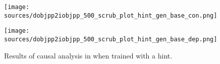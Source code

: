 \begin{figure}[t]
    \centering
    \begin{minipage}[b]{0.49\linewidth}
    \centering
    \texttt{[image: sources/dobjpp2iobjpp\_500\_scrub\_plot\_hint\_gen\_base\_con.png]}
    \end{minipage}
    \begin{minipage}[b]{0.49\linewidth}
    \centering
    \texttt{[image: sources/dobjpp2iobjpp\_500\_scrub\_plot\_hint\_gen\_base\_dep.png]}
    \end{minipage}
    \caption{Results of causal analysis in \dobjppiobjpp{} when trained with a hint.}
    \label{fig:results_hint}
\end{figure}